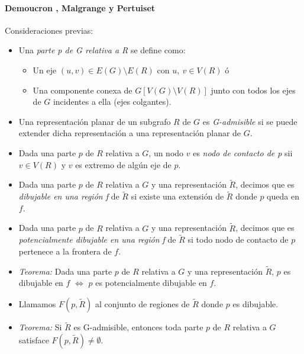 \paragraph{Demoucron , Malgrange y Pertuiset}
Consideraciones previas:
\begin{itemize}
    \item Una \textit{parte p de G relativa a R} se define como:
        \begin{itemize}
            \item Un eje $(u,v) \in E(G) \setminus E(R)$ con $u,\ v \in V(R)$ ó
            \item Una componente conexa de $G[V(G) \setminus V(R)]$ junto con todos los ejes de $G$ incidentes a ella (ejes colgantes).
        \end{itemize}
    \item Una representación planar de un subgrafo $R$ de $G$ es \textit{G-admisible} si se puede extender dicha representación a una representación planar de $G$.
    \item Dada una parte $p$ de $R$ relativa a $G$, un nodo $v$ es \textit{nodo de contacto de p} sii $v \in V(R)$ y $v$ es extremo de algún eje de $p$.
    \item Dada una parte $p$ de $R$ relativa a $G$ y una representación $\tilde R$, decimos que es \textit{dibujable en una región f} de $\tilde R$ si existe una extensión de $\tilde R$ donde $p$ queda en $f$.
    \item Dada una parte $p$ de $R$ relativa a $G$ y una representación $\tilde R$, decimos que es \textit{potencialmente dibujable en una región f} de $\tilde R$ si todo nodo de contacto de $p$ pertenece a la frontera de $f$.
    \item \textit{Teorema:} Dada una parte $p$ de $R$ relativa a $G$ y una representación $\tilde R$, $p$ es dibujable en $f$ $\iff$ $p$ es potencialmente dibujable en $f$.
    \item Llamamos $F(p, \tilde R)$ al conjunto de regiones de $\tilde R$ donde $p$ es dibujable.
    \item \textit{Teorema:} Si $\tilde R$ es G-admisible, entonces toda parte $p$ de $R$ relativa a $G$ satisface $F(p, \tilde R) \neq \emptyset$.
\end{itemize}

